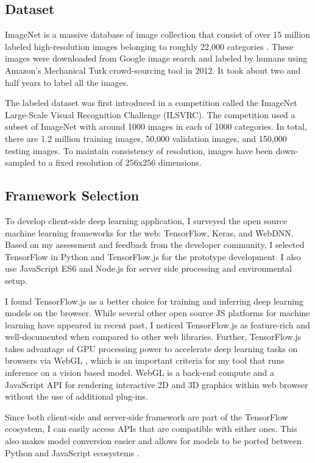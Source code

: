 \subsection{Dataset}

ImageNet is a massive database of image collection that consist of over 15 million labeled high-resolution images belonging to roughly 22,000 categories \cite{edsarx.1409.057520140101}. These images were downloaded from Google image search and labeled by humans using Amazon's Mechanical Turk crowd-sourcing tool in 2012. It took about two and half years to label all the images. 

The labeled dataset was first introduced in a competition called the ImageNet Large-Scale Visual Recognition Challenge (ILSVRC). The competition used a subset of ImageNet with around 1000 images in each of 1000 categories. In total, there are 1.2 million training images, 50,000 validation images, and 150,000 testing images. To maintain consistency of resolution, images have been down-sampled to a fixed resolution of 256x256 dimensions.
    
\subsection{Framework Selection}

To develop client-side deep learning application, I surveyed the open source machine learning frameworks for the web: TensorFlow, Keras, and WebDNN. Based on my assessment and feedback from the developer community, I selected TensorFlow in Python and TensorFlow.js for the prototype development. I also use JavaScript ES6 and Node.js for server side processing and environmental setup.

I found TensorFlow.js as a better choice for training and inferring deep learning models on the browser. While several other open source JS platforms for machine learning have appeared in recent past, I noticed TensorFlow.js as feature-rich and well-documented when compared to other web libraries. Further, TensorFlow.js takes advantage of GPU processing power to accelerate deep learning tasks on browsers via WebGL \cite{Ma2019}, which is an important criteria for my tool that runs inference on a vision based model. WebGL is a back-end compute and a JavaScript API for rendering interactive 2D and 3D graphics within web browser without the use of additional plug-ins.

Since both client-side and server-side framework are part of the TensorFlow ecosystem, I can easily access APIs that are compatible with either ones. This also makes model conversion easier and allows for models to be ported between Python and JavaScript ecosystems \cite{Smilkov2019}.

